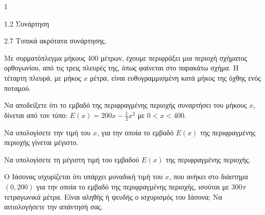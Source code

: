 \begin{ylh}{1}
    \item 1.2 Συνάρτηση
    \item 2.7 Τοπικά ακρότατα συνάρτησης.
\end{ylh}
\begin{figure} %
\centering
{}
\end{figure}
Με συρματόπλεγμα μήκους 400 μέτρων, έχουμε περιφράξει μια περιοχή σχήματος ορθογωνίου, από τις τρεις πλευρές της, όπως φαίνεται στο παρακάτω σχήμα. Η τέταρτη πλευρά, με μήκος $x$ μέτρα, είναι ευθυγραμμισμένη κατά μήκος της όχθης ενός ποταμού.
\begin{alist}
\item Να αποδείξετε ότι το εμβαδό της περιφραγμένης περιοχής συναρτήσει του μήκους $x$, δίνεται από τον τύπο: $E(x) = 200x - \frac{1}{2}x^2$ με $0 < x < 400$. 
\item Να υπολογίσετε την τιμή του $x$, για την οποία το εμβαδό $E(x)$ της περιφραγμένης περιοχής γίνεται μέγιστο. 
\item Να υπολογίσετε τη μέγιστη τιμή του εμβαδού $E(x)$ της περιφραγμένης περιοχής. 
\item Ο Ιάσονας ισχυρίζεται ότι υπάρχει μοναδική τιμή του $x$, που ανήκει στο διάστημα $(0, 200)$ για την οποία το εμβαδό της περιφραγμένης περιοχής, ισούται με $300\pi$ τετραγωνικά μέτρα. Είναι αληθής ή ψευδής ο ισχυρισμός του Ιάσονα; Να αιτιολογήσετε την απάντησή σας. 
\end{alist}